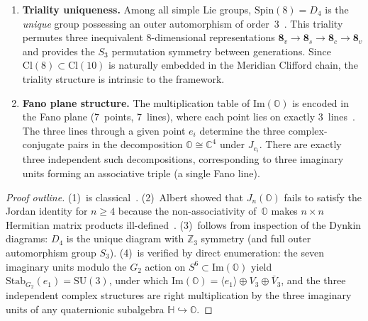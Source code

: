 \begin{theorem}
\begin{enumerate}
  \item \textbf{Triality uniqueness.} Among all simple Lie groups, $\mathrm{Spin}(8) = D_4$ is the \emph{unique} group possessing an outer automorphism of order~3~\cite{ch4:Baez2002}. This triality permutes three inequivalent 8-dimensional representations $\mathbf{8}_v \to \mathbf{8}_s \to \mathbf{8}_c \to \mathbf{8}_v$ and provides the $S_3$ permutation symmetry between generations. Since $\mathrm{Cl}(8) \subset \mathrm{Cl}(10)$ is naturally embedded in the Meridian Clifford chain, the triality structure is intrinsic to the framework.

  \item \textbf{Fano plane structure.} The multiplication table of $\mathrm{Im}(\mathbb{O})$ is encoded in the Fano plane (7~points, 7~lines), where each point lies on exactly 3~lines~\cite{ch4:Baez2002}. The three lines through a given point $e_i$ determine the three complex-conjugate pairs in the decomposition $\mathbb{O} \cong \mathbb{C}^4$ under $J_{e_i}$. There are exactly three independent such decompositions, corresponding to three imaginary units forming an associative triple (a single Fano line).
\end{enumerate}
\end{theorem}

\begin{proof}[Proof outline]
(1)~is classical~\cite{ch4:Hurwitz1898}. (2)~Albert showed that $J_n(\mathbb{O})$ fails to satisfy the Jordan identity for $n \geq 4$ because the non-associativity of~$\mathbb{O}$ makes $n \times n$ Hermitian matrix products ill-defined~\cite{ch4:Albert1934}. (3)~follows from inspection of the Dynkin diagrams: $D_4$ is the unique diagram with $\mathbb{Z}_3$ symmetry (and full outer automorphism group $S_3$). (4)~is verified by direct enumeration: the seven imaginary units modulo the $G_2$ action on $S^6 \subset \mathrm{Im}(\mathbb{O})$ yield $\mathrm{Stab}_{G_2}(e_1) = \mathrm{SU}(3)$, under which $\mathrm{Im}(\mathbb{O}) = \langle e_1 \rangle \oplus V_3 \oplus \bar{V}_3$, and the three independent complex structures are right multiplication by the three imaginary units of any quaternionic subalgebra $\mathbb{H} \hookrightarrow \mathbb{O}$.
\end{proof}

